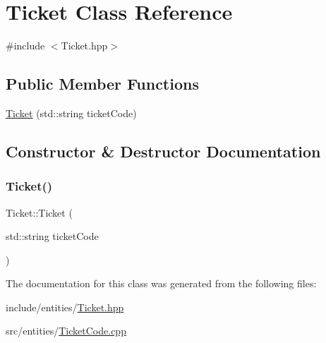 \hypertarget{class_ticket}{}\section{Ticket Class Reference}
\label{class_ticket}


{\ttfamily \#include $<$Ticket.\+hpp$>$}

\subsection*{Public Member Functions}
\begin{DoxyCompactItemize}
\item 
\mbox{\hyperlink{class_ticket_a84520fb1ab1eec222a6ad84df0ed0cfd}{Ticket}} (std\+::string ticket\+Code)
\end{DoxyCompactItemize}


\subsection{Constructor \& Destructor Documentation}
\mbox{\label{class_ticket_a84520fb1ab1eec222a6ad84df0ed0cfd}} 
\subsubsection{\texorpdfstring{Ticket()}{Ticket()}}
{\footnotesize\ttfamily Ticket\+::\+Ticket (\begin{DoxyParamCaption}\item[{std\+::string}]{ticket\+Code }\end{DoxyParamCaption})}



The documentation for this class was generated from the following files\+:\begin{DoxyCompactItemize}
\item 
include/entities/\mbox{\hyperlink{_ticket_8hpp}{Ticket.\+hpp}}\item 
src/entities/\mbox{\hyperlink{entities_2_ticket_code_8cpp}{Ticket\+Code.\+cpp}}\end{DoxyCompactItemize}

